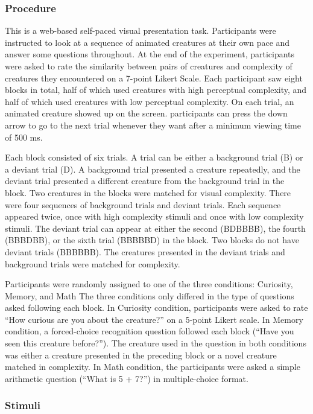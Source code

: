 \documentclass[10pt, letterpaper]{article}
\begin{document}
\hypertarget{procedure}{%
\subsubsection{Procedure}\label{procedure}}

This is a web-based self-paced visual presentation task. Participants
were instructed to look at a sequence of animated creatures at their own
pace and answer some questions throughout. At the end of the experiment,
participants were asked to rate the similarity between pairs of
creatures and complexity of creatures they encountered on a 7-point
Likert Scale. Each participant saw eight blocks in total, half of which
used creatures with high perceptual complexity, and half of which used
creatures with low perceptual complexity. On each trial, an animated
creature showed up on the screen. participants can press the down arrow
to go to the next trial whenever they want after a minimum viewing time
of 500 ms.

Each block consisted of six trials. A trial can be either a background
trial (B) or a deviant trial (D). A background trial presented a
creature repeatedly, and the deviant trial presented a different
creature from the background trial in the block. Two creatures in the
blocks were matched for visual complexity. There were four sequences of
background trials and deviant trials. Each sequence appeared twice, once
with high complexity stimuli and once with low complexity stimuli. The
deviant trial can appear at either the second (BDBBBB), the fourth
(BBBDBB), or the sixth trial (BBBBBD) in the block. Two blocks do not
have deviant trials (BBBBBB). The creatures presented in the deviant
trials and background trials were matched for complexity.

Participants were randomly assigned to one of the three conditions:
Curiosity, Memory, and Math The three conditions only differed in the
type of questions asked following each block. In Curiosity condition,
participants were asked to rate ``How curious are you about the
creature?'' on a 5-point Likert scale. In Memory condition, a
forced-choice recognition question followed each block (``Have you seen
this creature before?''). The creature used in the question in both
conditions was either a creature presented in the preceding block or a
novel creature matched in complexity. In Math condition, the
participants were asked a simple arithmetic question (``What is 5 +
7?'') in multiple-choice format.

\hypertarget{stimuli}{%
\subsubsection{Stimuli}\label{stimuli}}
\end{document}

